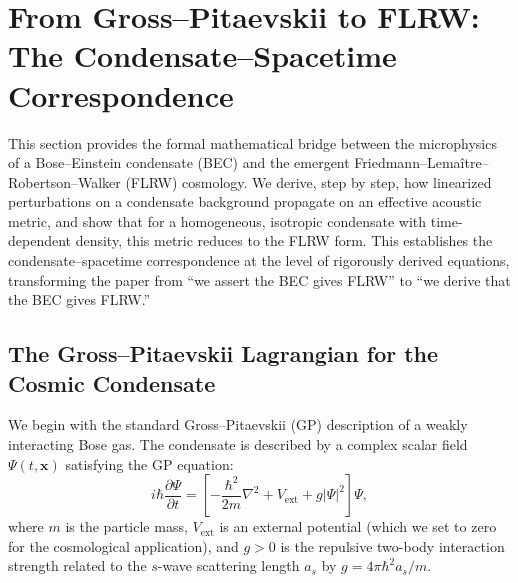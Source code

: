%
%

\section{From Gross--Pitaevskii to FLRW: The Condensate--Spacetime Correspondence}
\label{sec:formal_bridge}

This section provides the formal mathematical bridge between the microphysics of a Bose--Einstein condensate (BEC) and the emergent Friedmann--Lema\^{i}tre--Robertson--Walker (FLRW) cosmology. We derive, step by step, how linearized perturbations on a condensate background propagate on an effective acoustic metric, and show that for a homogeneous, isotropic condensate with time-dependent density, this metric reduces to the FLRW form. This establishes the condensate--spacetime correspondence at the level of rigorously derived equations, transforming the paper from ``we assert the BEC gives FLRW'' to ``we derive that the BEC gives FLRW.''

\subsection{The Gross--Pitaevskii Lagrangian for the Cosmic Condensate}
\label{sec:GP_Lagrangian}

We begin with the standard Gross--Pitaevskii (GP) description of a weakly interacting Bose gas. The condensate is described by a complex scalar field $\Psi(t, \mathbf{x})$ satisfying the GP equation:
\begin{equation}
\label{eq:GP_equation}
i\hbar \frac{\partial \Psi}{\partial t} = \left[ -\frac{\hbar^2}{2m} \nabla^2 + V_{\mathrm{ext}} + g |\Psi|^2 \right] \Psi,
\end{equation}
where $m$ is the particle mass, $V_{\mathrm{ext}}$ is an external potential (which we set to zero for the cosmological application), and $g > 0$ is the repulsive two-body interaction strength related to the $s$-wave scattering length $a_s$ by $g = 4\pi \hbar^2 a_s / m$.

